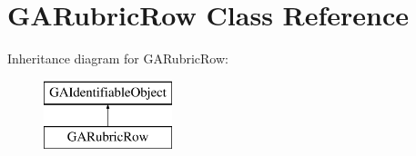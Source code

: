 \hypertarget{class_g_a_rubric_row}{}\section{G\+A\+Rubric\+Row Class Reference}
\label{class_g_a_rubric_row}
Inheritance diagram for G\+A\+Rubric\+Row\+:\begin{figure}[H]
\begin{center}
\leavevmode
\includegraphics[height=2.000000cm]{class_g_a_rubric_row}
\end{center}
\end{figure}
